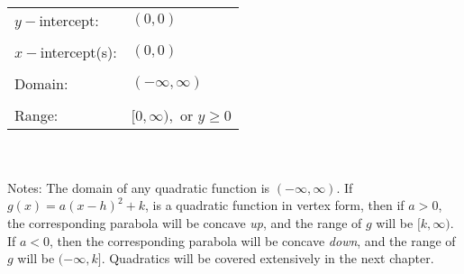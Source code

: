 \documentclass[12pt]{book}
\theoremstyle{definition}
\begin{document}
\ \par
\begin{tabular}{ll}
$y-$intercept: & $(0,0)$\\
&\\
$x-$intercept(s): & $(0,0)$\\
&\\
Domain: & $(-\infty,\infty)$\\
&\\
Range: & $[0,\infty),$ or $y\geq 0$
\end{tabular}
\\
~\\

Notes: The domain of any quadratic function is $(-\infty,\infty)$.  If $g(x)=a(x-h)^2+k$, is a quadratic function in vertex form, then if $a>0$, the corresponding parabola will be concave {\it up}, and the range of $g$ will be $[k,\infty)$.  If $a<0$, then the corresponding parabola will be concave {\it down}, and the range of $g$ will be $(-\infty,k]$.  Quadratics will be covered extensively in the next chapter.
\newpage
\end{document}
